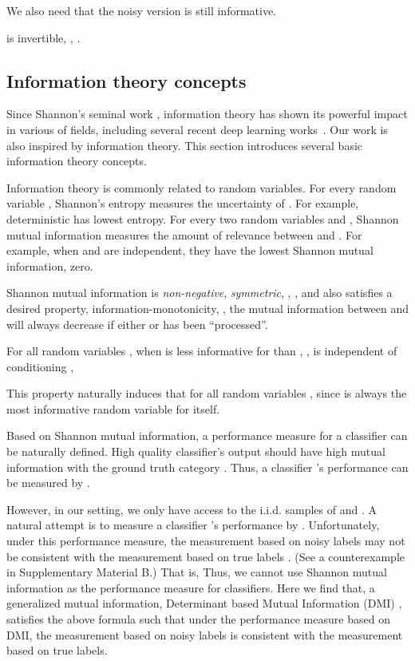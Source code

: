 We also need that the noisy version  is still informative. 
 
 \begin{assumption}
	 is invertible, \ie, .
\end{assumption}







\subsection{Information theory concepts}


Since Shannon's seminal work \cite{shannon}, information theory has shown its powerful impact in various of fields, including several recent deep learning works~\cite{hjelm2018learning, cao2018max,kong2018water}. Our work is also inspired by information theory. This section introduces several basic information theory concepts. 

Information theory is commonly related to random variables. For every random variable , Shannon's entropy  measures the uncertainty of . For example, deterministic  has lowest entropy. For every two random variables  and , Shannon mutual information  measures the amount of relevance between  and . For example, when  and  are independent, they have the lowest Shannon mutual information, zero. 

Shannon mutual information is \emph{non-negative}, \emph{symmetric}, \ie, , and also satisfies a desired property, information-monotonicity, \ie, the mutual information between  and  will always decrease if either  or  has been ``processed''. 

\begin{fact}
	For all random variables , when  is less informative for  than , \ie,  is independent of  conditioning , 
\end{fact}
This property naturally induces that for all random variables ,  since  is always the most informative random variable for itself. 

Based on Shannon mutual information, a performance measure for a classifier  can be naturally defined. High quality classifier's output  should have high mutual information with the ground truth category . Thus, a classifier 's performance can be measured by . 

However, in our setting, we only have access to the i.i.d. samples of  and . A natural attempt is to measure a classifier 's performance by . Unfortunately, under this performance measure, the measurement based on noisy labels  may not be consistent with the measurement based on true labels . (See a counterexample in Supplementary Material B.) That is,
 Thus, we cannot use Shannon mutual information as the performance measure for classifiers. Here we find that, a generalized mutual information, Determinant based Mutual Information (DMI) \cite{Kong2019}, satisfies the above formula such that under the performance measure based on DMI, the measurement based on noisy labels is consistent with the measurement based on true labels.



